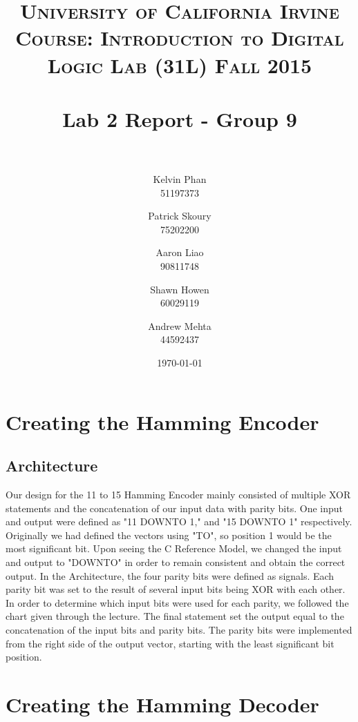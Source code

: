 \documentclass[paper=letter, fontsize=11pt]{scrartcl}
\title{	
\normalfont \normalsize 
\textsc{University of California Irvine} \\  %
\textsc{Course: Introduction to Digital Logic Lab (31L) Fall 2015} \\ [25pt]
\horrule{0.5pt} \\[0.4cm] %
\huge Lab 2 Report - Group 9\\ %
\horrule{2pt} \\[0.5cm] %
}
\author{Kelvin Phan \\ 51197373
	\and
	Patrick Skoury \\ 75202200
	\and
	Aaron Liao \\ 90811748
	\and
	Shawn Howen \\ 60029119
	\and
	Andrew Mehta \\ 44592437
}
\date{\large\today} %
\numberwithin{equation}{section} %
\numberwithin{figure}{section} %
\numberwithin{table}{section} %
\begin{document}
\maketitle %


\section{Creating the Hamming Encoder}

\subsection{Architecture}
\begin{flushleft}
	Our design for the 11 to 15 Hamming Encoder mainly consisted of multiple XOR statements and the concatenation of our input data with parity bits. One input and output were defined as "11 DOWNTO 1," and "15 DOWNTO 1" respectively. Originally we had defined the vectors using "TO", so position 1 would be the most significant bit. Upon seeing the C Reference Model, we changed the input and output to "DOWNTO" in order to remain consistent and obtain the correct output. In the Architecture, the four parity bits were defined as signals. Each parity bit was set to the result of several input bits being XOR with each other. In order to determine which input bits were used for each parity, we followed the chart given through the lecture. The final statement set the output equal to the concatenation of the input bits and parity bits. The parity bits were implemented from the right side of the output vector, starting with the least significant bit position. \\[20pt]
\end{flushleft}


\section{Creating the Hamming Decoder}
\end{document}
